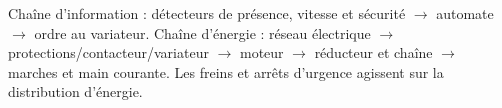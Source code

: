\begin{corrigebox}
Chaîne d'information : détecteurs de présence, vitesse et sécurité
        $\rightarrow$ automate $\rightarrow$ ordre au variateur. Chaîne d'énergie : réseau
        électrique $\rightarrow$ protections/contacteur/variateur $\rightarrow$ moteur
        $\rightarrow$ réducteur et chaîne $\rightarrow$ marches et main courante. Les
        freins et arrêts d'urgence agissent sur la distribution d'énergie.
\end{corrigebox}
